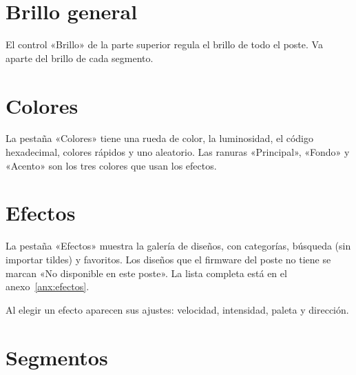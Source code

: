 
\section{Brillo general}

El control «Brillo» de la parte superior regula el brillo de todo el poste. Va aparte del brillo de cada segmento.


\section{Colores}

La pestaña «Colores» tiene una rueda de color, la luminosidad, el código hexadecimal, colores rápidos y uno aleatorio. Las ranuras «Principal», «Fondo» y «Acento» son los tres colores que usan los efectos.


\section{Efectos}

La pestaña «Efectos» muestra la galería de diseños, con categorías, búsqueda (sin importar tildes) y favoritos. Los diseños que el firmware del poste no tiene se marcan «No disponible en este poste». La lista completa está en el anexo~\ref{anx:efectos}.


Al elegir un efecto aparecen sus ajustes: velocidad, intensidad, paleta y dirección.


\section{Segmentos}

